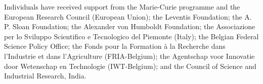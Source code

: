 Individuals have received support from the Marie-Curie programme and the European Research 
Council (European Union); the Leventis Foundation; the A. P. Sloan Foundation; the Alexander 
von Humboldt Foundation; the Associazione per lo Sviluppo Scientifico e Tecnologico del 
Piemonte (Italy); the Belgian Federal Science Policy Office; the Fonds pour la 
Formation \`a la Recherche dans l'Industrie et dans l'Agriculture (FRIA-Belgium); 
the Agentschap voor Innovatie door Wetenschap en Technologie (IWT-Belgium); and the 
Council of Science and Industrial Research, India. 

